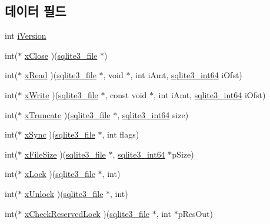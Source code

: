 \subsection*{데이터 필드}
\begin{DoxyCompactItemize}
\item 
int \hyperlink{structsqlite3__io__methods_ad1c72bdfde750a09a797f314a096a965}{i\+Version}
\item 
int($\ast$ \hyperlink{structsqlite3__io__methods_ae0673b03bfa033d59188bfdab418cd26}{x\+Close} )(\hyperlink{structsqlite3__file}{sqlite3\+\_\+file} $\ast$)
\item 
int($\ast$ \hyperlink{structsqlite3__io__methods_ac1433ffc0da0414a2a67a46d338d83eb}{x\+Read} )(\hyperlink{structsqlite3__file}{sqlite3\+\_\+file} $\ast$, void $\ast$, int i\+Amt, \hyperlink{sqlite3_8h_a0a4d3e6c1ad46f90e746b920ab6ca0d2}{sqlite3\+\_\+int64} i\+Ofst)
\item 
int($\ast$ \hyperlink{structsqlite3__io__methods_a659f6a40777b685c6a6b80e5f07a3328}{x\+Write} )(\hyperlink{structsqlite3__file}{sqlite3\+\_\+file} $\ast$, const void $\ast$, int i\+Amt, \hyperlink{sqlite3_8h_a0a4d3e6c1ad46f90e746b920ab6ca0d2}{sqlite3\+\_\+int64} i\+Ofst)
\item 
int($\ast$ \hyperlink{structsqlite3__io__methods_abe797948913bfe94d4fab7246773af50}{x\+Truncate} )(\hyperlink{structsqlite3__file}{sqlite3\+\_\+file} $\ast$, \hyperlink{sqlite3_8h_a0a4d3e6c1ad46f90e746b920ab6ca0d2}{sqlite3\+\_\+int64} size)
\item 
int($\ast$ \hyperlink{structsqlite3__io__methods_ad4b78f6b0b475e621fe29fb1cc886437}{x\+Sync} )(\hyperlink{structsqlite3__file}{sqlite3\+\_\+file} $\ast$, int flags)
\item 
int($\ast$ \hyperlink{structsqlite3__io__methods_ae875f158de72435f40ca0bd5207d9862}{x\+File\+Size} )(\hyperlink{structsqlite3__file}{sqlite3\+\_\+file} $\ast$, \hyperlink{sqlite3_8h_a0a4d3e6c1ad46f90e746b920ab6ca0d2}{sqlite3\+\_\+int64} $\ast$p\+Size)
\item 
int($\ast$ \hyperlink{structsqlite3__io__methods_ac88793475b0c4188fb02c229f1a11e8b}{x\+Lock} )(\hyperlink{structsqlite3__file}{sqlite3\+\_\+file} $\ast$, int)
\item 
int($\ast$ \hyperlink{structsqlite3__io__methods_a5ce75a5ca2df9c1edcaef74d4c0d7e38}{x\+Unlock} )(\hyperlink{structsqlite3__file}{sqlite3\+\_\+file} $\ast$, int)
\item 
int($\ast$ \hyperlink{structsqlite3__io__methods_a484752731e4a054c97497ad8d48a344b}{x\+Check\+Reserved\+Lock} )(\hyperlink{structsqlite3__file}{sqlite3\+\_\+file} $\ast$, int $\ast$p\+Res\+Out)

\end{DoxyCompactItemize}
